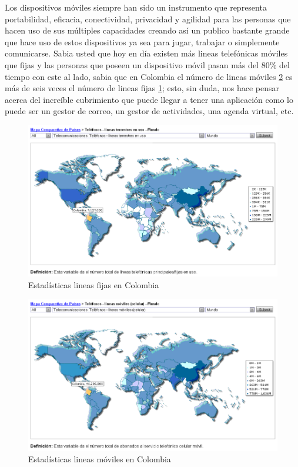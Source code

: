 \documentclass[11pt]{book}
\begin{document}
Los dispositivos móviles siempre han sido un instrumento que representa portabilidad, eficacia, conectividad, privacidad y agilidad para las personas que hacen uso de sus múltiples capacidades creando así un publico bastante grande que hace uso de estos dispositivos ya sea para jugar, trabajar o simplemente comunicarse. Sabia usted que hoy en día existen más lineas telefónicas móviles que fijas y las personas que poseen un dispositivo móvil pasan más del 80\% del tiempo con este al lado, sabia que en Colombia el número de lineas móviles \ref{fig:estadisticas2} es más de seis veces el número de lineas fijas \ref{fig:estadisticas1}; esto, sin duda, nos hace pensar acerca del increíble cubrimiento que puede llegar a tener una aplicación como lo puede ser un gestor de correo, un gestor de actividades, una agenda virtual, etc.

\newpage
\begin{figure}[H]
  \centering
    \includegraphics[width=1.0\textwidth]{estadisticas_1}
  \caption{Estadísticas lineas fijas en Colombia}
  \label{fig:estadisticas1}
\end{figure}

\begin{figure}[H]
  \centering
    \includegraphics[width=1.0\textwidth]{estadisticas_2}
  \caption{Estadísticas lineas móviles en Colombia}
  \label{fig:estadisticas2}
\end{figure}
\end{document}
